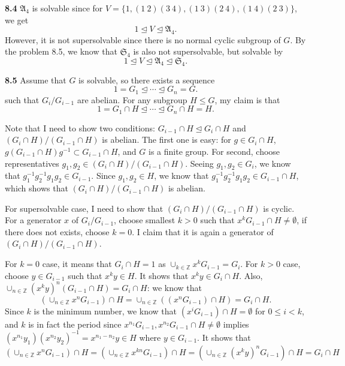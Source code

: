 \documentclass[a4paper, 12pt]{article}
\theoremstyle{Mydefinition}
\theoremstyle{Mytheorem}
\begin{document}
\noindent \textbf{8.4}
$\mathfrak{A}_4$ is solvable since for $V = \{1, (1~2)(3~4), (1~3)(2~4), (1~4)(2~3)\}$, we get
\begin{equation}
    1\trianglelefteq V\trianglelefteq \mathfrak{A}_4.
\end{equation}
However, it is not supersolvable since there is no normal cyclic subgroup of $G$. By the problem 8.5, we know that $\mathfrak{S}_4$ is also not supersolvable, but solvable by
\begin{equation}
    1\trianglelefteq V\trianglelefteq \mathfrak{A}_4\trianglelefteq \mathfrak{S}_4.
\end{equation}

\noindent \textbf{8.5}
Assume that $G$ is solvable, so there exists a sequence
\begin{equation}
    1=G_1\trianglelefteq \cdots \trianglelefteq G_n = G.
\end{equation}
such that $G_i/G_{i-1}$ are abelian. For any subgroup $H\leq G$, my claim is that
\begin{equation}
    1 = G_1\cap H\trianglelefteq \cdots \trianglelefteq G_n\cap H = H.
\end{equation}

Note that I need to show two conditions: $G_{i-1}\cap H\trianglelefteq G_{i}\cap H$ and $(G_i\cap H)/(G_{i-1}\cap H)$ is abelian. The first one is easy: for $g\in G_i\cap H$, $g(G_{i-1}\cap H)g^{-1}\subset G_{i-1}\cap H$, and $G$ is a finite group. For second, choose representatives $g_1,g_2\in (G_i\cap H)/(G_{i-1}\cap H)$. Seeing $g_1,g_2\in G_i$, we know that $g_1^{-1}g_2^{-1}g_1g_2\in G_{i-1}$. Since $g_1,g_2\in H$, we know that $g_1^{-1}g_2^{-1}g_1g_2\in G_{i-1}\cap H$, which shows that $(G_i\cap H)/(G_{i-1}\cap H)$ is abelian.

For supersolvable case, I need to show that $(G_i\cap H)/(G_{i-1}\cap H)$ is cyclic. For a generator $x$ of $G_i/G_{i-1}$, choose smallest $k>0$ such that $x^kG_{i-1}\cap H \neq \emptyset$, if there does not exists, choose $k=0$. I claim that it is again a generator of $(G_i\cap H)/(G_{i-1}\cap H)$.

For $k=0$ case, it means that $G_i\cap H=1$ as $\cup_{k\in\mathbb{Z}} x^kG_{i-1}=G_{i}$. For $k>0$ case, choose $y\in G_{i-1}$ such that $x^ky\in H$. It shows that $x^ky\in G_i\cap H$. Also, $\cup_{n\in\mathbb{Z}} (x^ky)^n(G_{i-1}\cap H) = G_i\cap H$: we know that
\begin{equation}
    \left(\cup_{n\in\mathbb{Z}} x^nG_{i-1}\right)\cap H = \cup_{n\in\mathbb{Z}} \left((x^nG_{i-1})\cap H\right) = G_i\cap H.
\end{equation}
Since $k$ is the minimum number, we know that $(x^{i}G_{i-1})\cap H = \emptyset$ for $0\leq i<k$, and $k$ is in fact the period since $x^{n_1}G_{i-1},x^{n_2}G_{i-1}\cap H\neq \emptyset$ implies $(x^{n_1}y_1)(x^{n_2}y_2)^{-1} = x^{n_1-n_2}y\in H$ where $y\in G_{i-1}$. It shows that
\begin{equation}
    \left(\cup_{n\in\mathbb{Z}} x^nG_{i-1}\right)\cap H =\left(\cup_{n\in\mathbb{Z}} x^{kn}G_{i-1}\right)\cap H =\left(\cup_{n\in\mathbb{Z}} (x^{k}y)^nG_{i-1}\right)\cap H= G_i\cap H
\end{equation}
\end{document}

